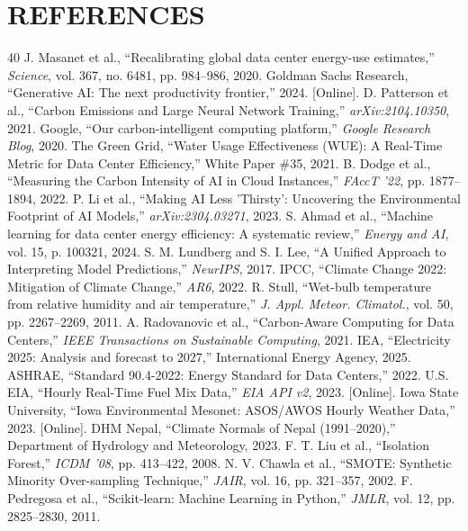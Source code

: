 \documentclass[conference]{IEEEtran}
\begin{document}
\section*{REFERENCES}
\begin{thebibliography}{40}
 J. Masanet et al., ``Recalibrating global data center energy-use estimates,'' \textit{Science}, vol. 367, no. 6481, pp. 984–986, 2020.
 Goldman Sachs Research, ``Generative AI: The next productivity frontier,'' 2024. [Online].
 D. Patterson et al., ``Carbon Emissions and Large Neural Network Training,'' \textit{arXiv:2104.10350}, 2021.
 Google, ``Our carbon-intelligent computing platform,'' \textit{Google Research Blog}, 2020.
 The Green Grid, ``Water Usage Effectiveness (WUE): A Real-Time Metric for Data Center Efficiency,'' White Paper \#35, 2021.
 B. Dodge et al., ``Measuring the Carbon Intensity of AI in Cloud Instances,'' \textit{FAccT '22}, pp. 1877–1894, 2022.
 P. Li et al., ``Making AI Less 'Thirsty': Uncovering the Environmental Footprint of AI Models,'' \textit{arXiv:2304.03271}, 2023.
 S. Ahmad et al., ``Machine learning for data center energy efficiency: A systematic review,'' \textit{Energy and AI}, vol. 15, p. 100321, 2024.
 S. M. Lundberg and S. I. Lee, ``A Unified Approach to Interpreting Model Predictions,'' \textit{NeurIPS}, 2017.
 IPCC, ``Climate Change 2022: Mitigation of Climate Change,'' \textit{AR6}, 2022.
 R. Stull, ``Wet-bulb temperature from relative humidity and air temperature,'' \textit{J. Appl. Meteor. Climatol.}, vol. 50, pp. 2267–2269, 2011.
 A. Radovanovic et al., ``Carbon-Aware Computing for Data Centers,'' \textit{IEEE Transactions on Sustainable Computing}, 2021.
 IEA, ``Electricity 2025: Analysis and forecast to 2027,'' International Energy Agency, 2025.
 ASHRAE, ``Standard 90.4-2022: Energy Standard for Data Centers,'' 2022.
 U.S. EIA, ``Hourly Real-Time Fuel Mix Data,'' \textit{EIA API v2}, 2023. [Online].
 Iowa State University, ``Iowa Environmental Mesonet: ASOS/AWOS Hourly Weather Data,'' 2023. [Online].
 DHM Nepal, ``Climate Normals of Nepal (1991–2020),'' Department of Hydrology and Meteorology, 2023.
 F. T. Liu et al., ``Isolation Forest,'' \textit{ICDM '08}, pp. 413–422, 2008.
 N. V. Chawla et al., ``SMOTE: Synthetic Minority Over-sampling Technique,'' \textit{JAIR}, vol. 16, pp. 321–357, 2002.
 F. Pedregosa et al., ``Scikit-learn: Machine Learning in Python,'' \textit{JMLR}, vol. 12, pp. 2825–2830, 2011.

\end{thebibliography}
\end{document}
